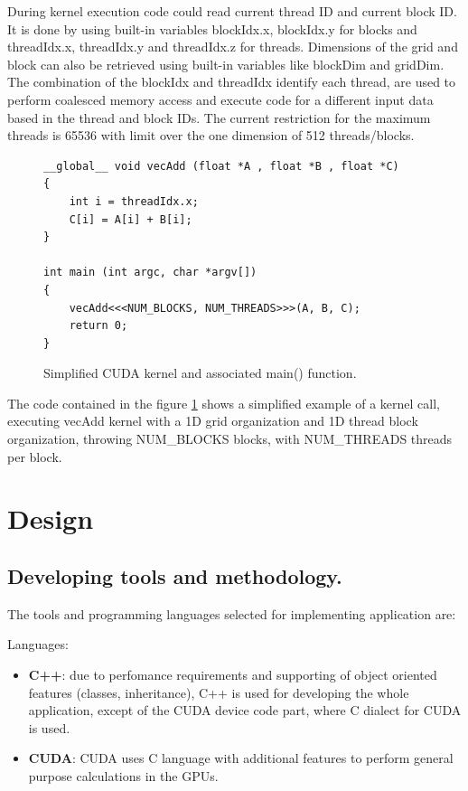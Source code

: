 \documentclass[thesis=M,english]{FITthesis}[2011/07/15]
\begin{document}
During kernel execution code could read current thread ID and current block ID. It is done by using built-in variables blockIdx.x, blockIdx.y for blocks and threadIdx.x, threadIdx.y and threadIdx.z for threads. Dimensions of the grid and block can also be retrieved using built-in variables like blockDim and gridDim. The combination of the blockIdx and threadIdx identify each thread, are used to perform coalesced memory access and execute code for a different input data based in the thread and block IDs. The current restriction for the maximum threads is 65536 with limit over the one dimension of 512 threads/blocks.

\begin{figure}[h]
\begin{lstlisting}
__global__ void vecAdd (float *A , float *B , float *C)
{
	int i = threadIdx.x;
	C[i] = A[i] + B[i];
}

int main (int argc, char *argv[])
{
	vecAdd<<<NUM_BLOCKS, NUM_THREADS>>>(A, B, C);
	return 0;
}

\end{lstlisting}
\caption{Simplified CUDA kernel and associated main() function.}
\label{fig:cuda_kernel}
\end{figure}

The code contained in the figure \ref{fig:cuda_kernel} shows a simplified example of a kernel call, executing vecAdd kernel with a 1D grid organization and 1D thread block organization, throwing NUM\_BLOCKS blocks, with NUM\_THREADS threads per block.

\chapter{Design}
\label{chap:design}

\section{Developing tools and methodology.}
The tools and programming languages selected for implementing application are:

Languages:

\begin{itemize}
\item \textbf{C++}: due to perfomance requirements and supporting of object oriented features (classes, inheritance), C++ is used for developing the whole application, except of the CUDA device code part, where C dialect for CUDA is used.
\item \textbf{CUDA}: CUDA uses C language with additional features to perform general purpose calculations in the GPUs.
\end{itemize}
\end{document}
